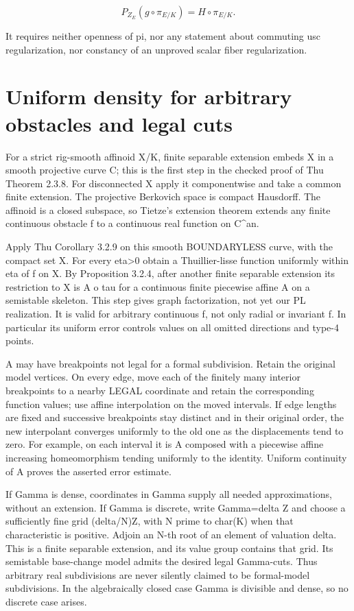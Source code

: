\documentclass[11pt]{article}
\begin{document}
\[
P_{Z_E}(g\circ\pi_{E/K})=H\circ\pi_{E/K}.
\]

It requires neither openness of pi, nor any statement about commuting usc regularization, nor constancy of an unproved scalar fiber regularization.

\section{Uniform density for arbitrary obstacles and legal cuts}

For a strict rig-smooth affinoid X/K, finite separable extension embeds X in a smooth projective curve C; this is the first step in the checked proof of Thu Theorem 2.3.8. For disconnected X apply it componentwise and take a common finite extension. The projective Berkovich space is compact Hausdorff. The affinoid is a closed subspace, so Tietze's extension theorem extends any finite continuous obstacle f to a continuous real function on C\textasciicircum{}an.

Apply Thu Corollary 3.2.9 on this smooth BOUNDARYLESS curve, with the compact set X. For every eta>0 obtain a Thuillier-lisse function uniformly within eta of f on X. By Proposition 3.2.4, after another finite separable extension its restriction to X is A o tau for a continuous finite piecewise affine A on a semistable skeleton. This step gives graph factorization, not yet our PL realization. It is valid for arbitrary continuous f, not only radial or invariant f. In particular its uniform error controls values on all omitted directions and type-4 points.

A may have breakpoints not legal for a formal subdivision. Retain the original model vertices. On every edge, move each of the finitely many interior breakpoints to a nearby LEGAL coordinate and retain the corresponding function values; use affine interpolation on the moved intervals. If edge lengths are fixed and successive breakpoints stay distinct and in their original order, the new interpolant converges uniformly to the old one as the displacements tend to zero. For example, on each interval it is A composed with a piecewise affine increasing homeomorphism tending uniformly to the identity. Uniform continuity of A proves the asserted error estimate.

If Gamma is dense, coordinates in Gamma supply all needed approximations, without an extension. If Gamma is discrete, write Gamma=delta Z and choose a sufficiently fine grid (delta/N)Z, with N prime to char(K) when that characteristic is positive. Adjoin an N-th root of an element of valuation delta. This is a finite separable extension, and its value group contains that grid. Its semistable base-change model admits the desired legal Gamma-cuts. Thus arbitrary real subdivisions are never silently claimed to be formal-model subdivisions. In the algebraically closed case Gamma is divisible and dense, so no discrete case arises.
\end{document}
